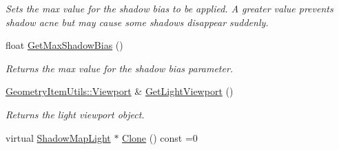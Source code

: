 \begin{DoxyCompactItemize}
\begin{DoxyCompactList}\small\item\em Sets the max value for the shadow bias to be applied. A greater value prevents shadow acne but may cause some shadows disappear suddenly. \end{DoxyCompactList}\item 
\mbox{\label{class_geometry_engine_1_1_geometry_world_item_1_1_geometry_light_1_1_shadow_map_light_a6e0a525a1d150179e26af0d068e9379e}} 
float \mbox{\hyperlink{class_geometry_engine_1_1_geometry_world_item_1_1_geometry_light_1_1_shadow_map_light_a6e0a525a1d150179e26af0d068e9379e}{Get\+Max\+Shadow\+Bias}} ()
\begin{DoxyCompactList}\small\item\em Returns the max value for the shadow bias parameter. \end{DoxyCompactList}\item 
\mbox{\label{class_geometry_engine_1_1_geometry_world_item_1_1_geometry_light_1_1_shadow_map_light_a986229a76d4977bd4abb55bc412c2faf}} 
\mbox{\hyperlink{class_geometry_engine_1_1_geometry_item_utils_1_1_viewport}{Geometry\+Item\+Utils\+::\+Viewport}} \& \mbox{\hyperlink{class_geometry_engine_1_1_geometry_world_item_1_1_geometry_light_1_1_shadow_map_light_a986229a76d4977bd4abb55bc412c2faf}{Get\+Light\+Viewport}} ()
\begin{DoxyCompactList}\small\item\em Returns the light viewport object. \end{DoxyCompactList}\item 
virtual \mbox{\hyperlink{class_geometry_engine_1_1_geometry_world_item_1_1_geometry_light_1_1_shadow_map_light}{Shadow\+Map\+Light}} $\ast$ \mbox{\hyperlink{class_geometry_engine_1_1_geometry_world_item_1_1_geometry_light_1_1_shadow_map_light_a48eb6af2e6bb8487568ee4265fbc49ee}{Clone}} () const =0
\end{DoxyCompactItemize}
